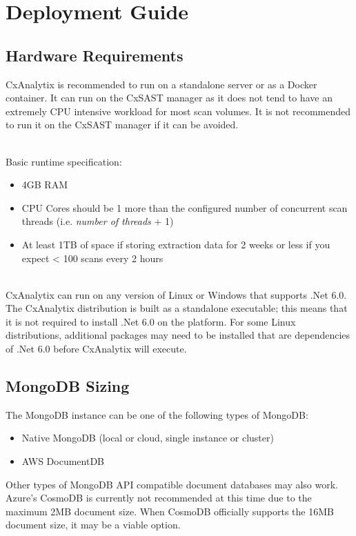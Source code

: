 \chapter{Deployment Guide}


\section{Hardware Requirements}

CxAnalytix is recommended to run on a standalone server or as a Docker container. It can run on the CxSAST manager 
as it does not tend to have an extremely CPU intensive workload for most scan volumes. It is not recommended to run it on the CxSAST manager 
if it can be avoided.

\noindent\\
Basic runtime specification:
    \begin{itemize}
        \item 4GB RAM
        \item CPU Cores should be 1 more than the configured number of concurrent scan threads (i.e. \textit{number of threads} + 1)
        \item At least 1TB of space if storing extraction data for 2 weeks or less if you expect < 100 scans every 2 hours
    \end{itemize}

\noindent\\CxAnalytix can run on any version of Linux or Windows that supports .Net 6.0.  The CxAnalytix distribution is built
as a standalone executable; this means that it is not required to install .Net 6.0 on the platform.  For some Linux distributions,
additional packages may need to be installed that are dependencies of .Net 6.0 before CxAnalytix will execute.

\section{MongoDB Sizing}

The MongoDB instance can be one of the following types of MongoDB:

\begin{itemize}
    \item Native MongoDB (local or cloud, single instance or cluster)
    \item AWS DocumentDB
\end{itemize}

\noindent Other types of MongoDB API compatible document databases may also work.  Azure's CosmoDB is currently not recommended at this time due to the 
maximum 2MB document size.  When CosmoDB officially supports the 16MB document size, it may be a viable option.

